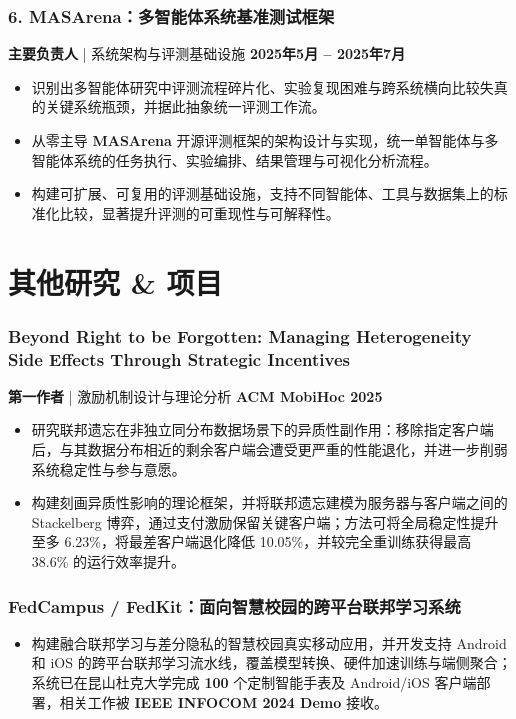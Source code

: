 \documentclass[10pt,a4paper]{article}
\begin{document}
\subsubsection*{6. \color{itemcolor}MASArena：多智能体系统基准测试框架}
\noindent\textbf{\color{sectioncolor}主要负责人} | 系统架构与评测基础设施 \hfill \color{accentcolor}\textbf{2025年5月 -- 2025年7月}
\begin{itemize}[leftmargin=*]
    \item 识别出多智能体研究中评测流程碎片化、实验复现困难与跨系统横向比较失真的关键系统瓶颈，并据此抽象统一评测工作流。
    \item 从零主导 \textbf{MASArena} 开源评测框架的架构设计与实现，统一单智能体与多智能体系统的任务执行、实验编排、结果管理与可视化分析流程。
    \item 构建可扩展、可复用的评测基础设施，支持不同智能体、工具与数据集上的标准化比较，显著提升评测的可重现性与可解释性。
\end{itemize}

\section*{\color{sectioncolor}其他研究 \& 项目}
\subsubsection*{\color{itemcolor}Beyond Right to be Forgotten: Managing Heterogeneity Side Effects Through Strategic Incentives}
\noindent\textbf{\color{sectioncolor}第一作者} | 激励机制设计与理论分析 \hfill \color{accentcolor}\textbf{ACM MobiHoc 2025}
\begin{itemize}[leftmargin=*]
    \item 研究联邦遗忘在非独立同分布数据场景下的异质性副作用：移除指定客户端后，与其数据分布相近的剩余客户端会遭受更严重的性能退化，并进一步削弱系统稳定性与参与意愿。
    \item 构建刻画异质性影响的理论框架，并将联邦遗忘建模为服务器与客户端之间的 Stackelberg 博弈，通过支付激励保留关键客户端；方法可将全局稳定性提升至多 6.23\%，将最差客户端退化降低 10.05\%，并较完全重训练获得最高 38.6\% 的运行效率提升。
\end{itemize}

\subsubsection*{\color{itemcolor}FedCampus / FedKit：面向智慧校园的跨平台联邦学习系统}
\begin{itemize}[leftmargin=*]
    \item 构建融合联邦学习与差分隐私的智慧校园真实移动应用，并开发支持 Android 和 iOS 的跨平台联邦学习流水线，覆盖模型转换、硬件加速训练与端侧聚合；系统已在昆山杜克大学完成 \textbf{100} 个定制智能手表及 Android/iOS 客户端部署，相关工作被 \textbf{IEEE INFOCOM 2024 Demo} 接收。
\end{itemize}
\end{document}
